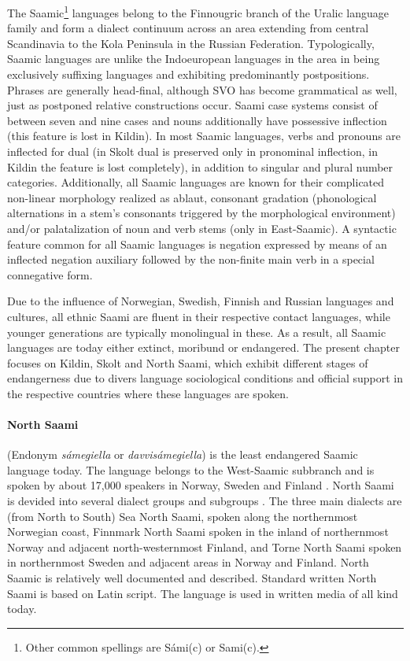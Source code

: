\documentclass[a4,12pt]{scrartcl}
\begin{document}
The Saamic\footnote{Other common spellings are Sámi(c) or Sami(c).} languages belong to the Finnougric branch of the Uralic language family and form a dialect continuum across an area extending from central Scandinavia to the Kola Peninsula in the Russian Federation. Typologically, Saamic languages are unlike the Indoeuropean languages in the area in being exclusively suffixing languages and exhibiting predominantly postpositions. Phrases are generally head-final, although SVO has become grammatical as well, just as postponed relative constructions occur. Saami case systems consist of between seven and nine cases and nouns additionally have possessive inflection (this feature is lost in Kildin). In most Saamic languages, verbs and pronouns are inflected for dual (in Skolt dual is preserved only in pronominal inflection, in Kildin the feature is lost completely), in addition to singular and plural number categories. Additionally, all Saamic languages are known for their complicated non-linear morphology realized as ablaut, consonant gradation (phonological alternations in a stem's consonants triggered by the morphological environment) and/or palatalization of noun and verb stems (only in East-Saamic). A syntactic feature common for all Saamic languages is negation expressed by means of an inflected negation auxiliary followed by the non-finite main verb in a special connegative form.

Due to the influence of Norwegian, Swedish, Finnish and Russian languages and cultures, all ethnic Saami are fluent in their respective contact languages, while younger generations are typically monolingual in these. As a result, all Saamic languages are today either extinct, moribund or endangered. The present chapter focuses on Kildin, Skolt and North Saami, which exhibit different stages of endangerness due to divers language sociological conditions and official support in the respective countries where these languages are spoken.

\paragraph{North Saami} (Endonym {\it sámegiella} or {\it davvisámegiella}) is the least endangered Saamic language today. The language belongs to the West-Saamic subbranch and is spoken by about 17,000 speakers in Norway, Sweden and Finland \cite[cf., e.g.,][1]{sammallahti1998b}. North Saami is devided into several dialect groups and subgroups \cite[e.g.][9–20]{sammallahti1998b}. The three main dialects are (from North to South) Sea North Saami, spoken along the northernmost Norwegian coast, Finnmark North Saami spoken in the inland of northernmost Norway and adjacent north-westernmost Finland, and Torne North Saami spoken in northernmost Sweden and adjacent areas in Norway and Finland. North Saamic is relatively well documented and described. Standard written North Saami is based on Latin script. The language is used in written media of all kind today.
\end{document}

